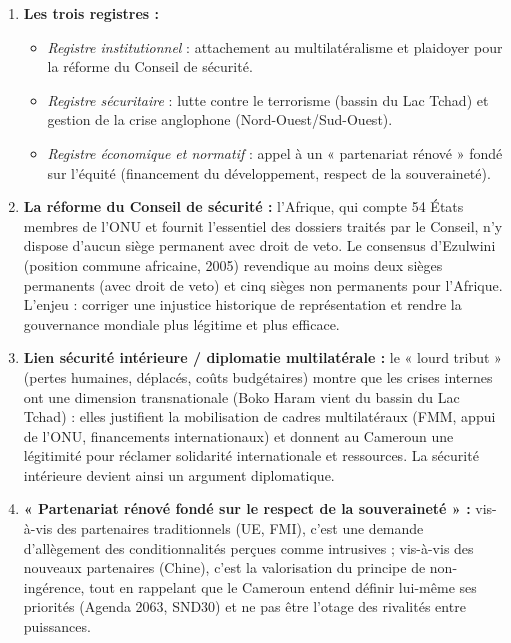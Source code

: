 \documentclass[11pt]{article}
\newcommand{\cle}[1]{{\popxbold\color{popdark}#1}}
\begin{document}
\begin{corrige}
\begin{enumerate}
    \item \textbf{Les trois registres :}
    \begin{itemize}
        \item \emph{Registre institutionnel} : attachement au multilatéralisme et plaidoyer pour la réforme du Conseil de sécurité.
        \item \emph{Registre sécuritaire} : lutte contre le terrorisme (bassin du Lac Tchad) et gestion de la crise anglophone (Nord-Ouest/Sud-Ouest).
        \item \emph{Registre économique et normatif} : appel à un « partenariat rénové » fondé sur l'équité (financement du développement, respect de la souveraineté).
    \end{itemize}
    \item \textbf{La réforme du Conseil de sécurité :} l'Afrique, qui compte 54 États membres de l'ONU et fournit l'essentiel des dossiers traités par le Conseil, n'y dispose d'aucun siège permanent avec droit de veto. Le \cle{consensus d'Ezulwini} (position commune africaine, 2005) revendique au moins deux sièges permanents (avec droit de veto) et cinq sièges non permanents pour l'Afrique. L'enjeu : corriger une injustice historique de représentation et rendre la gouvernance mondiale plus légitime et plus efficace.
    \item \textbf{Lien sécurité intérieure / diplomatie multilatérale :} le « lourd tribut » (pertes humaines, déplacés, coûts budgétaires) montre que les crises internes ont une dimension transnationale (Boko Haram vient du bassin du Lac Tchad) : elles justifient la mobilisation de cadres multilatéraux (FMM, appui de l'ONU, financements internationaux) et donnent au Cameroun une légitimité pour réclamer solidarité internationale et ressources. La sécurité intérieure devient ainsi un argument diplomatique.
    \item \textbf{« Partenariat rénové fondé sur le respect de la souveraineté » :} vis-à-vis des partenaires traditionnels (UE, FMI), c'est une demande d'allègement des conditionnalités perçues comme intrusives ; vis-à-vis des nouveaux partenaires (Chine), c'est la valorisation du principe de non-ingérence, tout en rappelant que le Cameroun entend définir lui-même ses priorités (Agenda 2063, SND30) et ne pas être l'otage des rivalités entre puissances.
\end{enumerate}
\end{corrige}
\end{document}
